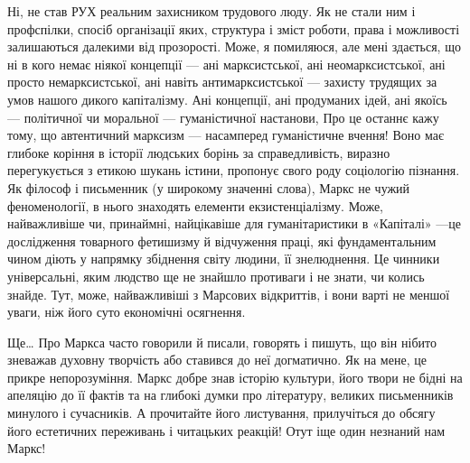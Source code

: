 Ні, не став РУХ реальним захисником трудового люду. Як не стали ним і 
профспілки, спосіб організації яких, структура і зміст роботи, права і 
можливості залишаються далекими від прозорості. Може, я помиляюся, але 
мені здається, що ні в кого немає ніякої концепції — ані марксистської, 
ані неомарксистської, ані просто немарксистської, ані навіть 
антимарксистської — захисту трудящих за умов нашого дикого 
капіталізму. Ані концепції, ані продуманих ідей, ані якоїсь — 
політичної чи моральної — гуманістичної настанови, Про це останнє 
кажу тому, що автентичний марксизм — насамперед гуманістичне вчення! 
Воно має глибоке коріння в історії людських борінь за справедливість, 
виразно перегукується з етикою шукань істини, пропонує свого роду 
соціологію пізнання. Як філософ і письменник (у широкому значенні 
слова), Маркс не чужий феноменології, в нього знаходять елементи 
екзистенціалізму. Може, найважливіше чи, принаймні, найцікавіше для 
гуманітаристики в «Капіталі» —це дослідження товарного фетишизму й 
відчуження праці, які фундаментальним чином діють у напрямку 
збіднення світу людини, її знелюднення. Це чинники універсальні, яким 
людство ще не знайшло противаги і не знати, чи колись знайде. Тут, може, 
найважливіші з Марсових відкриттів, і вони варті не меншої уваги, ніж 
його суто економічні осягнення. 


Ще\ldots{} Про Маркса часто говорили й писали, говорять і пишуть, що він 
нібито зневажав духовну творчість або ставився до неї догматично. Як 
на мене, це прикре непорозуміння. Маркс добре знав історію культури, 
його твори не бідні на апеляцію до її фактів та на глибокі думки про 
літературу, великих письменників минулого і сучасників. А прочитайте 
його листування, прилучіться до обсягу його естетичних переживань і 
читацьких реакцій! Отут іще один незнаний нам Маркс!


